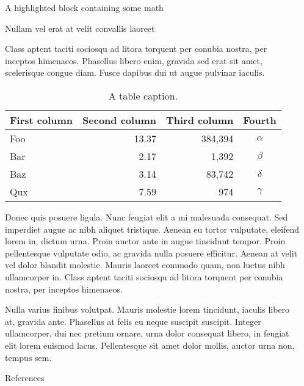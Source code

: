 \documentclass[final]{beamer}
\newlength{\sepwidth}
\newlength{\colwidth}
\newcommand{\separatorcolumn}{\begin{column}{\sepwidth}\end{column}}
\begin{document}
\begin{frame}[t]
\begin{columns}[t]
\begin{column}{\colwidth}
\begin{exampleblock}{A highlighted block containing some math}
			\end{exampleblock}

			\begin{block}{Nullam vel erat at velit convallis laoreet}

				Class aptent taciti sociosqu ad litora torquent per conubia nostra, per
				inceptos himenaeos. Phasellus libero enim, gravida sed erat sit amet,
				scelerisque congue diam. Fusce dapibus dui ut augue pulvinar iaculis.

				\begin{table}
					\centering
					\begin{tabular}{l r r c}
						\toprule
						\textbf{First column} & \textbf{Second column} & \textbf{Third column} & \textbf{Fourth} \\
						\midrule
						Foo                   & 13.37                  & 384,394               & $\alpha$        \\
						Bar                   & 2.17                   & 1,392                 & $\beta$         \\
						Baz                   & 3.14                   & 83,742                & $\delta$        \\
						Qux                   & 7.59                   & 974                   & $\gamma$        \\
						\bottomrule
					\end{tabular}
					\caption{A table caption.}
				\end{table}

				Donec quis posuere ligula. Nunc feugiat elit a mi malesuada consequat. Sed
				imperdiet augue ac nibh aliquet tristique. Aenean eu tortor vulputate,
				eleifend lorem in, dictum urna. Proin auctor ante in augue tincidunt
				tempor. Proin pellentesque vulputate odio, ac gravida nulla posuere
				efficitur. Aenean at velit vel dolor blandit molestie. Mauris laoreet
				commodo quam, non luctus nibh ullamcorper in. Class aptent taciti sociosqu
				ad litora torquent per conubia nostra, per inceptos himenaeos.

				Nulla varius finibus volutpat. Mauris molestie lorem tincidunt, iaculis
				libero at, gravida ante. Phasellus at felis eu neque suscipit suscipit.
				Integer ullamcorper, dui nec pretium ornare, urna dolor consequat libero,
				in feugiat elit lorem euismod lacus. Pellentesque sit amet dolor mollis,
				auctor urna non, tempus sem.

			\end{block}


			\begin{block}{References}

				\printbibliography
			\end{block}

		\end{column}

		\separatorcolumn

	\end{columns}
\end{frame}
\end{document}

